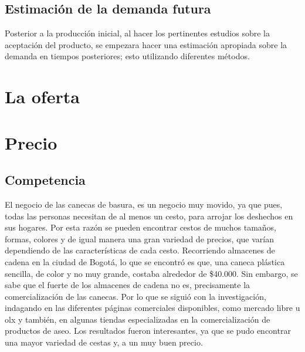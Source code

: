 \documentclass[letterpaper,12pt]{scrreprt}
\begin{document}
    \section{Estimación de la demanda futura}
    Posterior a la producción inicial, al hacer los pertinentes estudios sobre la aceptación del producto, se empezara hacer una estimación apropiada sobre la demanda en tiempos posteriores; esto utilizando diferentes métodos.

\chapter{La oferta}


\chapter{Precio}

    \section{Competencia}
    El negocio de las canecas de basura, es un negocio muy movido, ya que pues, todas las personas necesitan de al menos un cesto, para arrojar los deshechos en sus hogares. Por esta razón se pueden encontrar cestos de muchos tamaños, formas, colores y de igual manera una gran variedad de precios, que varían dependiendo de las características de cada cesto.
Recorriendo almacenes de cadena en la ciudad de Bogotá, lo que se encontró es que, una caneca plástica sencilla, de color y no muy grande, costaba alrededor de \$40.000. Sin embargo, se sabe que el fuerte de los almacenes de cadena no es, precisamente la comercialización de las canecas.
 Por lo que se siguió con la investigación, indagando en las diferentes páginas comerciales disponibles, como mercado libre u olx y también, en algunas tiendas especializadas en la comercialización de productos de aseo. Los resultados fueron interesantes, ya que se pudo encontrar una mayor variedad de cestas y, a un muy buen precio.
\end{document}
